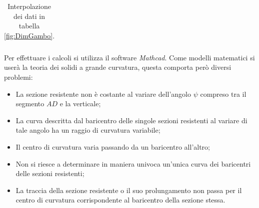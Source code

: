 \begin{table}[H]
{\begin{tabular}{ccccccccccccc}
\bottomrule
\end{tabular}}
\caption{Interpolazione dei dati in tabella \ref{fig:DimGambo}.}
\label{tab:interp_dimgambo}
\end{table}


Per effettuare i calcoli si utilizza il software \textit{Mathcad}.
Come modelli matematici si userà la teoria dei solidi a grande curvatura, questa comporta però diversi problemi:
\begin{itemize}
\item La sezione resistente non è costante al variare dell'angolo $\psi$ compreso tra il segmento $AD$ e la verticale;
\item La curva descritta dal baricentro delle singole sezioni resistenti al variare di tale angolo ha un raggio di curvatura variabile;
\item Il centro di curvatura varia passando da un baricentro all'altro;
\item Non si riesce a determinare in maniera univoca un'unica curva dei baricentri delle sezioni resistenti;
\item La traccia della sezione resistente o il suo prolungamento non passa per il centro di curvatura corrispondente al baricentro della sezione stessa.
\end{itemize}

